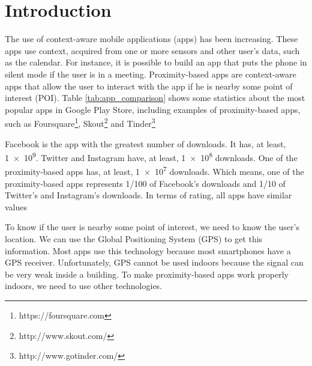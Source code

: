 
%
%

\section{Introduction}
\label{sec:introduction}


The use of context-aware mobile applications (apps)
has been increasing.
These apps use context, acquired
from one or more sensors and other user's data, 
such as the calendar. For instance, it is possible to
build an app that puts the phone in silent mode if the
user is in a meeting. Proximity-based apps are
context-aware apps that allow the user to interact
with the app if he is nearby some point of interest (POI).
Table \ref{tab:app_comparison} shows some statistics
about the most popular apps in Google Play Store,
including examples of proximity-based apps,
such as Foursquare\footnote{https://foursquare.com},
Skout\footnote{http://www.skout.com/} and
Tinder\footnote{http://www.gotinder.com/}



Facebook is the app with the
greatest number of downloads.
It has, at least, \num{1e9}. Twitter and Instagram
have, at least, \num{1e8} downloads.
One of the 
proximity-based apps has, at least, \num{1e7} downloads.
Which means, one of
the proximity-based apps represents
1/100 of Facebook's downloads and 1/10 of Twitter's
and Instagram's downloads. In terms of rating, all apps
have similar values

To know if the user is nearby some point of interest,
we need to know the user's location. We can use 
the Global Positioning System 
(GPS)\cite{masumoto1993global} to
get this information. Most apps use this technology 
because most smartphones have a GPS receiver. 
Unfortunately, GPS cannot be used indoors because 
the signal can
be very weak inside a building. To make proximity-based
apps work properly indoors, we need to use other 
technologies.

